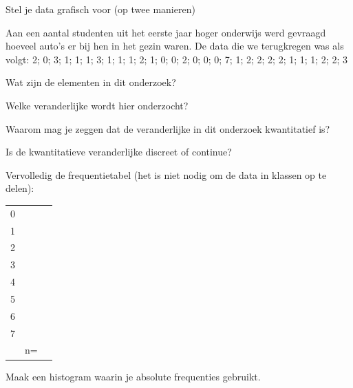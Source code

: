 \documentclass[12pt,twoside]{article}
\begin{document}
\newpage
Stel je data grafisch voor (op twee manieren)

\ruitjes{20cm}

\newpage
{}
Aan een aantal studenten uit het eerste jaar hoger onderwijs werd gevraagd hoeveel auto's er bij hen in het gezin waren. De data die we terugkregen was als volgt:
2; 0; 3; 1; 1; 1; 3; 1; 1; 1; 2; 1; 0; 0; 2; 0; 0; 0; 7; 1; 2; 2; 2; 2; 1; 1; 1; 2; 2; 3

Wat zijn de elementen in dit onderzoek?

Welke veranderlijke wordt hier onderzocht?

Waarom mag je zeggen dat de veranderlijke in dit onderzoek kwantitatief is?

Is de kwantitatieve veranderlijke discreet of continue?

Vervolledig de frequentietabel (het is niet nodig om de data in klassen op te delen):
\begin{center}
  \setlength{\tabcolsep}{7pt}
  \renewcommand{\arraystretch}{1.5}
  \begin{tabular}{p{4cm}|p{4cm}|p{4cm}}
    &&\\
    \hline
    0&&\\
    1&&\\
    2&&\\
    3&&\\
    4&&\\
    5&&\\
    6&&\\
    7&&\\
    &n=&\\
  \end{tabular}
\end{center}

Maak een histogram waarin je absolute frequenties gebruikt.

\begin{center}
\end{center}
\end{document}
